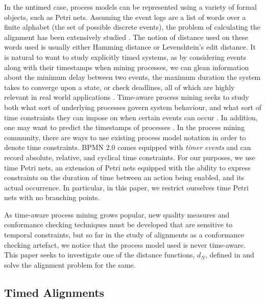 \documentclass[conference]{IEEEtran}
\begin{document}
	In the untimed case, process models can be represented using a variety of formal objects, such as Petri nets. 
	Assuming the event logs are a list of words over a finite alphabet (the set of possible discrete events), the problem of calculating the alignment has been extensively studied \cite{Adriansyah2014AligningOA} \cite{BCC21}. 
	The notion of distance used on these words used is usually either Hamming distance or Levenshtein's edit distance. 
	It is natural to want to study explicitly timed systems,
	as by considering events along with their timestamps when mining processes, we can glean information about the minimum delay between two events, the maximum duration the system takes to converge upon a state, or check deadlines, all of which are highly relevant in real world applications \cite{Cheikhrouhou2014TheTP} \cite{Eder1999TimeCI} \cite{inbook}. 
	Time-aware process mining seeks to study both what sort of underlying processes govern system behaviour, and what sort of time constraints they can impose on when certain events can occur \cite{RMAW13} \cite{CRHA20}  \cite{AS21}. 
	In addition, one may want to predict the timestamps of processes \cite{SSA11}. 
	In the process mining community, there are ways to use existing process model notation in order to denote time constraints. BPMN 2.0 comes equipped with \emph{timer events} and can record absolute, relative, and cyclical time constraints. 
	For our purposes, we use time Petri nets, an extension of Petri nets equipped with the ability to express constraints on the duration of time between an action being enabled, and its actual occurrence. In particular, in this paper, we restrict ourselves time Petri nets with no branching points. 
	
	As time-aware process mining grows popular, new quality measures and conformance checking techniques must be developed that are sensitive to temporal constraints, but so far in the study of alignments as a conformance checking artefact, we notice that the process model used is never time-aware. 
	This paper seeks to investigate one of the distance functions, $d_N$, defined in \cite{CR22} and solve the alignment problem for the same. 
	
	\subsection{Timed Alignments}
	
\end{document}
